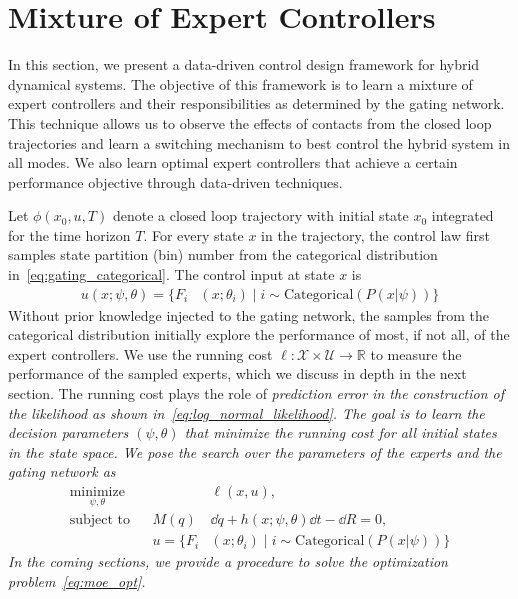 \section{Mixture of Expert Controllers}
\label{sec:moe_methods}

In this section, we present a data-driven control design framework for hybrid
dynamical systems. 
%
The objective of this framework is to learn a mixture of expert controllers and
their responsibilities as determined by the gating network.
%
This technique allows us to observe the effects of contacts from the closed loop
trajectories  and learn a switching mechanism to best control the hybrid system
in all modes.
%
We also learn optimal expert controllers that achieve a certain performance
objective through data-driven techniques.

%
Let $\phi(x_0, u, T)$ denote a closed loop trajectory with initial state $x_0$
integrated for the time horizon $T$.
%
For every state $x$ in the trajectory, the control law first samples state
partition (bin) number from the categorical distribution
in~\eqref{eq:gating_categorical}.
%
The control input at state $x$ is
\begin{align*}
    u(x; \psi, \theta) = \{F_i&(x; \theta_i) \; | \; i  \sim \text{Categorical} (P(x| \psi)) \}
\end{align*} 
%
Without prior knowledge injected to the gating network, the samples from the
categorical distribution initially explore the performance of most, if not all,
of the expert controllers.
%
We use the running cost $\ell : \mathcal{X} \times \mathcal{U} \rightarrow
\mathbb{R}$ to measure the performance of the sampled experts, which we discuss
in depth in the next section.
%
The running cost plays the role of \it{prediction error} \normalfont in the
construction of the likelihood as shown in~\eqref{eq:log_normal_likelihood}.
%
The goal is to learn the decision parameters $(\psi, \theta)$ that minimize the
running cost for all initial states in the state space.
%
We pose the search over the parameters of the experts and the gating network as
\begin{equation}
    \begin{aligned}
        \underset{\psi, \theta}{\textrm{minimize}} 
        & & & \ell (x,u)  , \\%
        \textrm{subject to}
        & & M(q) &\dd \dot{q} + h(x; \psi, \theta)\dd t - \dd R  = 0,\\%
        & & u = \{F_i&(x; \theta_i) \; | \; i  \sim \text{Categorical} (P(x| \psi)) \}
    \end{aligned}
    \label{eq:moe_opt}
\end{equation}
%
In the coming sections, we provide a procedure to solve the
optimization problem~\eqref{eq:moe_opt}. 

